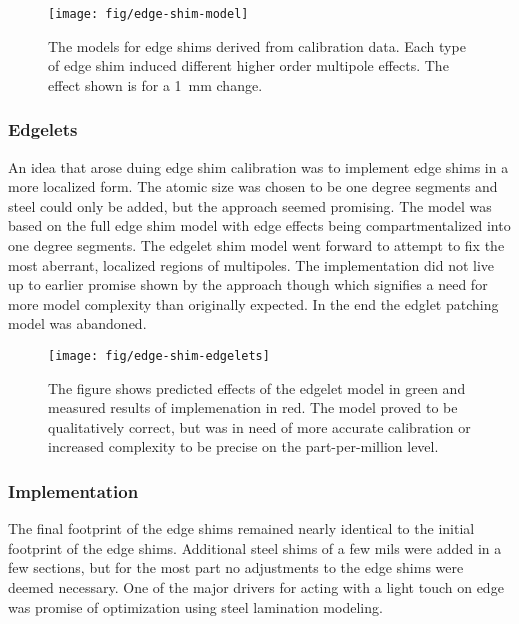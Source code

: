 \begin{figure}
\texttt{[image: fig/edge-shim-model]}
\caption{The models for edge shims derived from calibration data.  Each type of edge shim induced different higher order multipole effects.  The effect shown is for a \SI{1}{\milli\meter} change. }
\label{fig:edge-shim-model}
\end{figure}


\subsubsection{Edgelets}

An idea that arose duing edge shim calibration was to implement edge shims in a more localized form.  The atomic size was chosen to be one degree segments and steel could only be added, but the approach seemed promising.  The model was based on the full edge shim model with edge effects being compartmentalized into one degree segments.  The edgelet shim model went forward to attempt to fix the most aberrant, localized regions of multipoles.  The implementation did not live up to earlier promise shown by the approach though which signifies a need for more model complexity than originally expected. In the end the edglet patching model was abandoned.

\begin{figure}
\texttt{[image: fig/edge-shim-edgelets]}
\caption{The figure shows predicted effects of the edgelet model in green and measured results of implemenation in red.  The model proved to be qualitatively correct, but was in need of more accurate calibration or increased complexity to be precise on the part-per-million level.}
\label{fig:edge-shim-edgelets}
\end{figure}

\subsubsection{Implementation}

The final footprint of the edge shims remained nearly identical to the initial footprint of the edge shims.  Additional steel shims of a few mils were added in a few sections, but for the most part no adjustments to the edge shims were deemed necessary.  One of the major drivers for acting with a light touch on edge was promise of optimization using steel lamination modeling.

